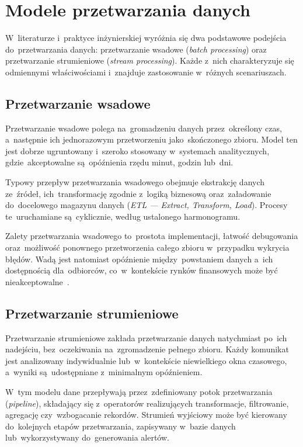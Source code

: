 \section{Modele przetwarzania danych}
\label{sec:modele_przetwarzania}

W~literaturze i~praktyce inżynierskiej wyróżnia się dwa podstawowe podejścia do~przetwarzania danych: przetwarzanie
wsadowe (\textit{batch processing}) oraz przetwarzanie strumieniowe (\textit{stream processing}).
Każde z~nich charakteryzuje się odmiennymi właściwościami i~znajduje zastosowanie w~różnych scenariuszach.

\subsection{Przetwarzanie wsadowe}
\label{subsec:batch_processing}

Przetwarzanie wsadowe polega na~gromadzeniu danych przez~określony czas, a~następnie ich jednorazowym przetworzeniu
jako~skończonego zbioru.
Model ten jest dobrze ugruntowany i~szeroko stosowany w~systemach analitycznych, gdzie~akceptowalne są~opóźnienia
rzędu minut, godzin lub~dni.

Typowy przepływ przetwarzania wsadowego obejmuje ekstrakcję danych ze~źródeł, ich~transformację zgodnie z~logiką
biznesową oraz~załadowanie do~docelowego magazynu danych (\textit{ETL --- Extract, Transform, Load}).
Procesy te~uruchamiane są~cyklicznie, według ustalonego harmonogramu.

Zalety przetwarzania wsadowego to~prostota implementacji, łatwość debugowania oraz~możliwość ponownego przetworzenia
całego zbioru w~przypadku wykrycia błędów.
Wadą jest natomiast opóźnienie między~powstaniem danych a~ich dostępnością dla~odbiorców, co~w~kontekście rynków
finansowych może być nieakceptowalne~\cite{bigdata_principles}.

\subsection{Przetwarzanie strumieniowe}
\label{subsec:stream_processing}

Przetwarzanie strumieniowe zakłada przetwarzanie danych natychmiast po~ich nadejściu, bez~oczekiwania na~zgromadzenie
pełnego zbioru.
Każdy komunikat jest analizowany indywidualnie lub~w~kontekście niewielkiego okna czasowego, a~wyniki są~udostępniane
z~minimalnym opóźnieniem.

W~tym modelu dane przepływają przez~zdefiniowany potok przetwarzania (\textit{pipeline}), składający się z~operatorów
realizujących transformacje, filtrowanie, agregację czy~wzbogacanie rekordów.
Strumień wyjściowy może być kierowany do~kolejnych etapów przetwarzania, zapisywany w~bazie danych lub~wykorzystywany
do~generowania alertów.

